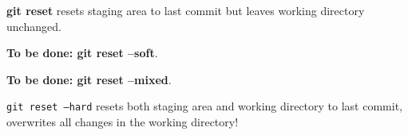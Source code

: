 %

\textbf{git reset} resets staging area to last commit but leaves working directory unchanged.

{\color{red} \textbf{To be done: git reset --soft}}.

{\color{red} \textbf{To be done: git reset --mixed}}.

\texttt{git reset --hard} resets both staging area and working directory to last commit, overwrites all changes in the working directory!


%